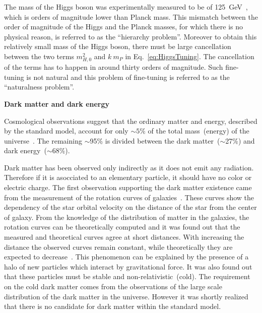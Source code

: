 The mass of the Higgs boson was experimentally measured to be of 125~GeV~\cite{Chatrchyan:2012xdj, Aad:2012tfa}, which is orders of magnitude lower than Planck mass. This mismatch between the order of magnitude of the Higgs and the Planck masses, for which there is no physical reason, is referred to as the ``hierarchy problem''. Moreover to obtain this relatively small mass of the Higgs boson, there must be large cancellation between the two terms $m_{H, 0}^{2}$ and $k ~m_{P}$  in Eq.~\ref{eq:HiggsTuning}. The cancellation of the terms has to happen in around thirty orders of magnitude. Such fine-tuning is not natural and this problem of fine-tuning is referred to as the ``naturalness problem''.


\textbf{Dark matter and dark energy}

Cosmological observations suggest that the ordinary matter and energy, described by the standard model, account for only $\sim 5\%$ of the total mass~(energy) of the universe~\cite{Bertone:2004pz, Bennett:2012zja}. The remaining $\sim$95\% is divided between the dark matter~($\sim$27\%) and dark energy~($\sim$68\%).

Dark matter has been observed only indirectly as it does not emit any radiation. Therefore if it is asocciated to an elementary particle, it should have no color or electric charge. The first observation supporting the dark matter existence came from the measurement of the rotation curves of galaxies~\cite{Zwicky:1937zza, Rubin:1980zd}. These curves show the dependency of the star orbital velocity on the distance of the star from the center of galaxy. From the knowledge of the distribution of matter in the galaxies, the rotation curves can be theoretically computed and it was found out that the measured and theoretical curves agree at short distances. With increasing the distance the observed curves remain constant, while theoretically they are expected to decrease~\cite{Bertone:2004pz}. This phenomenon can be explained by the presence of a halo of new particles which interact by gravitational force. It was also found out that these particles must be stable and non-relativistic~(cold). The requirement on the cold dark matter comes from the observations of the large scale distribution of the dark matter in the universe. However it was shortly realized that there is no candidate for dark matter within the standard model.

